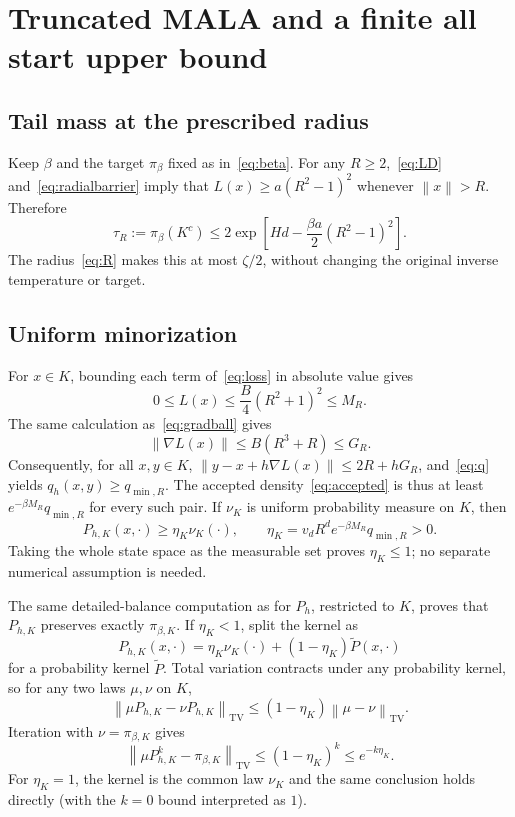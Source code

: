 \documentclass[11pt,letterpaper]{article}
\numberwithin{equation}{section}
\theoremstyle{remark}
\newcommand{\TV}{\mathrm{TV}}
\newcommand{\1}{\mathbf 1}
\newcommand{\norm}[1]{\left\lVert#1\right\rVert}
\begin{document}
\section{Truncated MALA and a finite all start upper bound}\label{sec:truncation}

\subsection{Tail mass at the prescribed radius}

Keep $\beta$ and the target $\pi_\beta$ fixed as in~\eqref{eq:beta}. For any $R\ge2$,~\eqref{eq:LD} and~\eqref{eq:radialbarrier} imply that $L(x)\ge a(R^2-1)^2$ whenever $\norm x>R$. Therefore
\begin{equation}\label{eq:tau}
 \tau_R:=\pi_\beta(K^c)
 \le2\exp\left[Hd-\frac{\beta a}{2}(R^2-1)^2\right].
\end{equation}
The radius~\eqref{eq:R} makes this at most $\zeta/2$, without changing the original inverse temperature or target.

\subsection{Uniform minorization}

For $x\in K$, bounding each term of~\eqref{eq:loss} in absolute value gives
\begin{equation}\label{eq:LMbound}
 0\le L(x)\le\frac B4(R^2+1)^2\le M_R.
\end{equation}
The same calculation as~\eqref{eq:gradball} gives
\begin{equation}\label{eq:GGbound}
 \norm{\nabla L(x)}\le B(R^3+R)\le G_R.
\end{equation}
Consequently, for all $x,y\in K$,
$\norm{y-x+h\nabla L(x)}\le2R+hG_R$,
and~\eqref{eq:q} yields $q_h(x,y)\ge q_{\min,R}$.
The accepted density~\eqref{eq:accepted} is thus at least
$e^{-\beta M_R}q_{\min,R}$ for every such pair. If $\nu_K$ is uniform probability measure on $K$, then
\begin{equation}\label{eq:minorization}
 P_{h,K}(x,\cdot)\ge\eta_K\nu_K(\cdot),
 \qquad \eta_K=v_dR^d e^{-\beta M_R}q_{\min,R}>0.
\end{equation}
Taking the whole state space as the measurable set proves $\eta_K\le1$; no separate numerical assumption is needed.

The same detailed-balance computation as for $P_h$, restricted to $K$, proves that $P_{h,K}$ preserves exactly $\pi_{\beta,K}$. If $\eta_K<1$, split the kernel as
\[
 P_{h,K}(x,\cdot)=\eta_K\nu_K(\cdot)+(1-\eta_K)\widetilde P(x,\cdot)
\]
for a probability kernel $\widetilde P$. Total variation contracts under any probability kernel, so for any two laws $\mu,\nu$ on $K$,
\[
 \norm{\mu P_{h,K}-\nu P_{h,K}}_{\TV}
 \le(1-\eta_K)\norm{\mu-\nu}_{\TV}.
\]
Iteration with $\nu=\pi_{\beta,K}$ gives
\begin{equation}\label{eq:contract}
 \norm{\mu P_{h,K}^k-\pi_{\beta,K}}_{\TV}
 \le(1-\eta_K)^k\le e^{-k\eta_K}.
\end{equation}
For $\eta_K=1$, the kernel is the common law $\nu_K$ and the same conclusion holds directly (with the $k=0$ bound interpreted as $1$).
\end{document}
